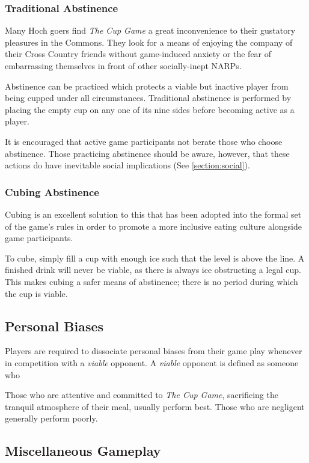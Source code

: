 \documentclass[12pt]{IEEEtran}
\begin{document}
\subsubsection{Traditional Abstinence} Many Hoch goers find \textit{The Cup Game} a great inconvenience to their gustatory pleasures in the Commons. They look for a means of enjoying the company of their Cross Country friends without game-induced anxiety or the fear of embarrassing themselves in front of other socially-inept NARPs.

Abstinence can be practiced which protects a viable but inactive player from being cupped under all circumstances. Traditional abstinence is performed by placing the empty cup on any one of its nine sides before becoming active as a player.

It is encouraged that active game participants not berate those who choose abstinence. Those practicing abstinence should be aware, however, that these actions do have inevitable social implications (See \ref{section:social}).
\subsubsection{Cubing Abstinence}  Cubing is an excellent solution to this that has been adopted into the formal set of the game's rules in order to promote a more inclusive eating culture alongside game participants.

To cube, simply fill a cup with enough ice such that the level is above the line. A finished drink will never be viable, as there is always ice obstructing a legal cup. This makes cubing a safer means of abstinence; there is no period during which the cup is viable.
\subsection{Personal Biases} Players are required to dissociate personal biases from their game play whenever in competition with a \textit{viable} opponent. A \textit{viable} opponent is defined as someone who

Those who are attentive and committed to \textit{The Cup Game}, sacrificing the tranquil atmosphere of their meal, usually perform best. Those who are negligent generally perform poorly.
\subsection{Miscellaneous Gameplay}
\end{document}
